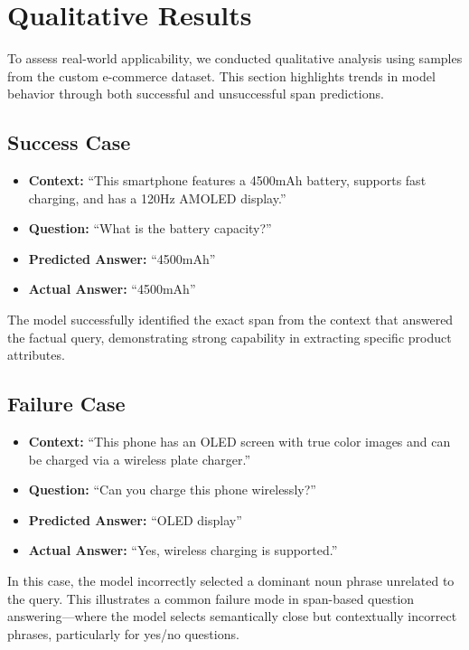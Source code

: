 \documentclass[10pt,conference]{IEEEtran}
\begin{document}
\section{Qualitative Results}

To assess real-world applicability, we conducted qualitative analysis using samples from the custom e-commerce dataset. This section highlights trends in model behavior through both successful and unsuccessful span predictions.

\subsection{Success Case}
\begin{itemize}
    \item \textbf{Context:} ``This smartphone features a 4500mAh battery, supports fast charging, and has a 120Hz AMOLED display.''
    \item \textbf{Question:} ``What is the battery capacity?''
    \item \textbf{Predicted Answer:} ``4500mAh''
    \item \textbf{Actual Answer:} ``4500mAh''
\end{itemize}

The model successfully identified the exact span from the context that answered the factual query, demonstrating strong capability in extracting specific product attributes.
\subsection{Failure Case}
\begin{itemize}
    \item \textbf{Context:} ``This phone has an OLED screen with true color images and can be charged via a wireless plate charger.''
    \item \textbf{Question:} ``Can you charge this phone wirelessly?''
    \item \textbf{Predicted Answer:} ``OLED display''
    \item \textbf{Actual Answer:} ``Yes, wireless charging is supported.''
\end{itemize}

In this case, the model incorrectly selected a dominant noun phrase unrelated to the query. This illustrates a common failure mode in span-based question answering—where the model selects semantically close but contextually incorrect phrases, particularly for yes/no questions.
\end{document}
